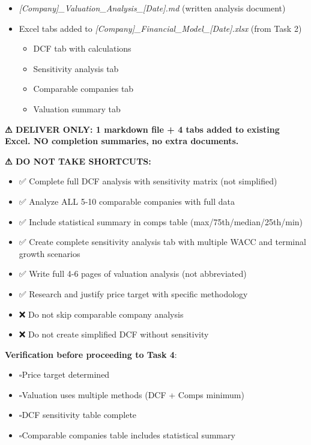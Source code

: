 \documentclass[11pt]{article}
\newcommand{\UncheckedBox}{$\square$}
\begin{document}
\begin{itemize}[leftmargin=*,itemsep=2pt,topsep=2pt]
\item {} \emph{[Company]\_\allowbreak{}Valuation\_\allowbreak{}Analysis\_\allowbreak{}[Date].md} (written analysis document)
\item {} Excel tabs added to \emph{[Company]\_\allowbreak{}Financial\_\allowbreak{}Model\_\allowbreak{}[Date].xlsx} (from Task 2)
\begin{itemize}[leftmargin=*,itemsep=2pt,topsep=2pt]
\item {} DCF tab with calculations
\item {} Sensitivity analysis tab
\item {} Comparable companies tab
\item {} Valuation summary tab
\end{itemize}
\end{itemize}

\textbf{⚠ DELIVER ONLY: 1 markdown file + 4 tabs added to existing Excel. NO completion summaries, no extra documents.}


\textbf{⚠ DO NOT TAKE SHORTCUTS:}

\begin{itemize}[leftmargin=*,itemsep=2pt,topsep=2pt]
\item {} ✅ Complete full DCF analysis with sensitivity matrix (not simplified)
\item {} ✅ Analyze ALL 5-10 comparable companies with full data
\item {} ✅ Include statistical summary in comps table (max/75th/median/25th/min)
\item {} ✅ Create complete sensitivity analysis tab with multiple WACC and terminal growth scenarios
\item {} ✅ Write full 4-6 pages of valuation analysis (not abbreviated)
\item {} ✅ Research and justify price target with specific methodology
\item {} ❌ Do not skip comparable company analysis
\item {} ❌ Do not create simplified DCF without sensitivity
\end{itemize}

\textbf{Verification before proceeding to Task 4}:

\begin{itemize}[leftmargin=*,itemsep=2pt,topsep=2pt]
\item {} \UncheckedBox Price target determined
\item {} \UncheckedBox Valuation uses multiple methods (DCF + Comps minimum)
\item {} \UncheckedBox DCF sensitivity table complete
\item {} \UncheckedBox Comparable companies table includes statistical summary
\end{itemize}
\end{document}
